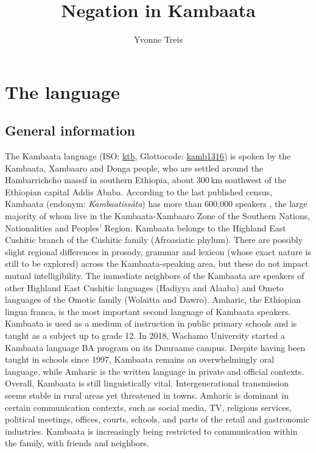 \documentclass[output=paper,colorlinks,citecolor=brown,draftmode
]{langscibook}
\title{Negation in Kambaata}
\author{Yvonne Treis\affiliation{CNRS-LLACAN}}%
\begin{document}
\maketitle


\section{The language}\label{sec:treis:1}
\subsection{General information}\label{sec:treis:1.1}

The Kambaata language (ISO: \href{https://iso639-3.sil.org/code/ktb}{ktb}, Glottocode: \href{https://glottolog.org/resource/languoid/id/kamb1316}{kamb1316}) is spoken by the Kambaata, Xambaaro and Donga people, who are settled around the Hambarrichcho massif in southern Ethiopia, about 300\,km southwest of the Ethiopian capital Addis Ababa. According to the last published census, Kambaata (endonym: \textit{Kambaatissáta}) has more than 600,000 speakers \citep[91]{CSA2007}, the large majority of whom live in the Kambaata-Xambaaro Zone of the Southern Nations, Nationalities and Peoples’ Region. Kambaata belongs to the Highland East Cushitic branch of the Cushitic family (Afroasiatic phylum). There are possibly slight regional differences in prosody, grammar and lexicon (whose exact nature is still to be explored) across the Kambaata-speaking area, but these do not impact mutual intelligibility. The immediate neighbors of the Kambaata are speakers of other Highland East Cushitic languages (Hadiyya and Alaaba) and Ometo languages of the Omotic family (Wolaitta and Dawro). Amharic, the Ethiopian lingua franca, is the most important second language of Kambaata speakers. Kambaata is used as a medium of instruction in public primary schools and is taught as a subject up to grade 12. In 2018, Wachamo University started a Kambaata language BA program on its Duu\-raame campus. Despite having been taught in schools since 1997, Kambaata remains an overwhelmingly oral language, while Amharic is the written language in private and official contexts. Overall, Kambaata is still linguistically vital. Intergenerational transmission seems stable in rural areas yet threatened in towns. Amharic is dominant in certain communication contexts, such as social media, TV, religious services, political meetings, offices, courts, schools, and parts of the retail and gastronomic industries. Kambaata is increasingly being restricted to communication within the family, with friends and neighbors.
\end{document}
